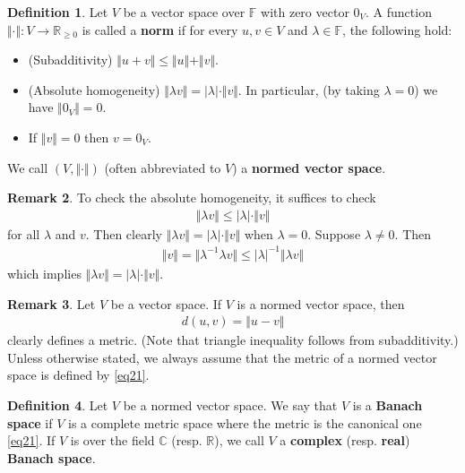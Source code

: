 \documentclass[12pt,b5paper,notitlepage]{article}
\theoremstyle{definition}
\newtheorem{df}{Definition}[section]
\newtheorem{rem}[df]{Remark}
\theoremstyle{plain}
\newcommand{\Cbb}{\mathbb C}
\newcommand{\Rbb}{\mathbb R}
\newcommand{\Fbb}{\mathbb F}
\numberwithin{equation}{section}
\begin{document}
\begin{df}\label{lb91}
Let $V$ be a vector space over $\Fbb$ with zero vector $0_V$. A function $\Vert\cdot\Vert:V\rightarrow\Rbb_{\geq 0}$ is called a \textbf{norm}  if for every $u,v\in V$ and $\lambda\in\Fbb$, the following hold:
\begin{itemize}
\item (Subadditivity) $\Vert u+v\Vert\leq \Vert u\Vert+\Vert v\Vert$. 
\item (Absolute homogeneity) $\Vert\lambda v\Vert=|\lambda|\cdot \Vert v\Vert$. In particular, (by taking $\lambda=0$) we have $\Vert 0_V\Vert=0$.
\item If $\Vert v\Vert=0$ then $v=0_V$.
\end{itemize}
We call $(V,\Vert\cdot\Vert)$ (often abbreviated to $V$) a \textbf{normed vector space}. 
\end{df}


\begin{rem}\label{lb367}
To check the absolute homogeneity, it suffices to check
\begin{align*}
\Vert\lambda v\Vert\leq |\lambda|\cdot\Vert v\Vert
\end{align*}
for all $\lambda$ and $v$. Then clearly $\Vert\lambda v\Vert=|\lambda|\cdot\Vert v\Vert$ when $\lambda=0$. Suppose $\lambda\neq 0$. Then
\begin{align*}
\Vert v\Vert=\Vert \lambda^{-1}\lambda v\Vert\leq |\lambda|^{-1}\Vert\lambda v\Vert
\end{align*}
which implies $\Vert\lambda v\Vert=|\lambda|\cdot\Vert v\Vert$.
\end{rem}

\begin{rem}
Let $V$ be a vector space. If $V$ is a normed vector space, then
\begin{align}
d(u,v)=\Vert u-v\Vert  \label{eq21}
\end{align} 
clearly defines a metric. (Note that triangle inequality follows from subadditivity.) Unless otherwise stated, we always assume that the metric of a normed vector space is defined by \eqref{eq21}.
\end{rem}






\begin{df}
Let $V$ be a normed vector space. We say that $V$ is a \textbf{Banach space}  if $V$ is a complete metric space where the metric is the canonical one \eqref{eq21}. If $V$ is over the field $\Cbb$ (resp. $\Rbb$), we call $V$ a \textbf{complex} (resp. \textbf{real}) \textbf{Banach space}.
\end{df}
\end{document}
